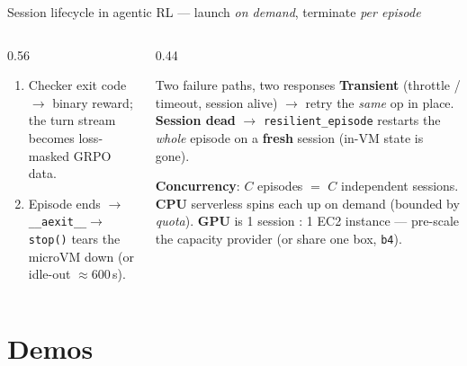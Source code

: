 \documentclass[aspectratio=169]{beamer}
\begin{document}
\begin{frame}{Session lifecycle in agentic RL --- launch \emph{on demand}, terminate \emph{per episode}}
\begin{columns}[T]
\begin{column}{0.56\textwidth}
\begin{enumerate}
        \item[\textbf{4}] Checker exit code $\to$ binary reward; the turn stream becomes loss-masked GRPO data.
        \item[\textbf{5}] Episode ends $\to$ \texttt{\_\_aexit\_\_}$\to$\texttt{stop()} tears the microVM down (or idle-out $\approx$600\,s).
      \end{enumerate}
    \end{column}
    \begin{column}{0.44\textwidth}
      \begin{block}{Two failure paths, two responses}
        \scriptsize \textbf{Transient} (throttle / timeout, session alive) $\to$ retry the \emph{same}
        op in place. \textbf{Session dead} $\to$ \texttt{resilient\_episode} restarts the \emph{whole}
        episode on a \textbf{fresh} session (in-VM state is gone).
      \end{block}
      \vspace{0.15em}
      {\scriptsize \textbf{Concurrency}: $C$ episodes $=$ $C$ independent sessions. \textbf{CPU} serverless
        spins each up on demand (bounded by \emph{quota}). \textbf{GPU} is 1 session : 1 EC2 instance ---
        pre-scale the capacity provider (or share one box, \texttt{b4}).}
    \end{column}
  \end{columns}
\end{frame}

\section{Demos}
\end{document}

